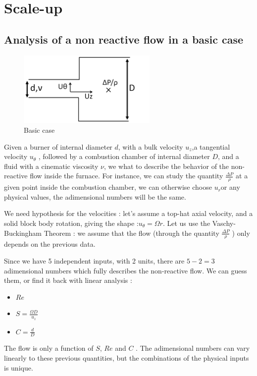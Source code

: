 \chapter[Scale-up]%
{Scale-up}
\label{Scale-up}

\section{Analysis of a non reactive flow in a basic case}

\begin{figure}[!h]
  \centering
\includegraphics[width=0.6\textwidth]{fig/Schema_Vashy1.png}
  \caption{Basic case}
 \label{Vaschy1}
\end{figure}
Given a burner of internal diameter $d$, with a bulk velocity $u_{z}$,a tangential velocity $u_{\theta}$ ,  followed by a combustion chamber of internal diameter $D$, and a fluid with a cinematic viscosity $\nu$, we what to describe the behavior of the non-reactive flow inside the furnace. For instance, we can study the quantity $\frac{\Delta P}{\rho}$ at a given point inside the combustion chamber, we can otherwise choose $u_{r}$or any physical values, the adimensional numbers will be the same.

We need hypothesis for the velocities : let's assume a top-hat axial velocity, and a solid block body rotation, giving the shape :$u_{\theta}=\Omega r$. Let us use the Vaschy-Buckingham Theorem : we assume that the flow (through the quantity $\frac{\Delta P}{\rho}$ ) only depends on the previous data. 

Since we have 5 independent inputs, with 2 units, there are $5-2=3$ adimensional numbers which fully describes the non-reactive flow. We can guess them, or find it back with linear analysis :
\begin{itemize}
\item $Re$ 
\item $S=\frac{\Omega D}{u_{z}}$
\item $C=\frac{d}{D}$
\end{itemize}
The flow is only a function of $S$, $Re$ and $C$ . The adimensional numbers can vary linearly to these previous quantities, but the combinations of the physical inputs is unique.

